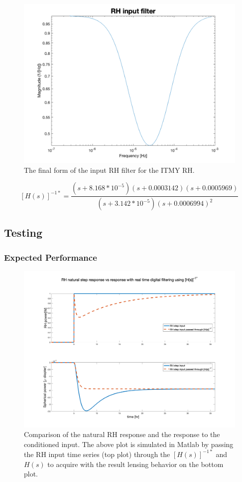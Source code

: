 \documentclass[colorlinks=true,pdfstartview=FitV,linkcolor=blue,
            citecolor=magenta,urlcolor=red]{ligodoc}
\begin{document}
\begin{figure}[H]
\includegraphics[page=2,width=\textwidth]{figures/matlab/IRHF.png}
\caption{The final form of the input RH filter for the ITMY RH.}
\label{fig:inv_plant_filt_mod}
\end{figure}

$$ [H(s)]^{-1*} = \frac{(s+8.168*10^{-5}) (s+0.0003142) (s+0.0005969)}{(s+3.142*10^{-5}) (s+0.0006994)^2} $$


\newpage
\subsection{Testing}
\subsubsection{Expected Performance}

\begin{figure}[H]
\includegraphics[width=\textwidth]{figures/matlab/PI_paper.png}
\caption{Comparison of the natural RH response and the response to the conditioned input. The above plot is simulated in Matlab by passing the RH input time series (top plot) through the $[H(s)]^{-1*}$ and $H(s)$ to acquire with the result lensing behavior on the bottom plot.}
\label{fig:comparison}
\end{figure}
\end{document}
